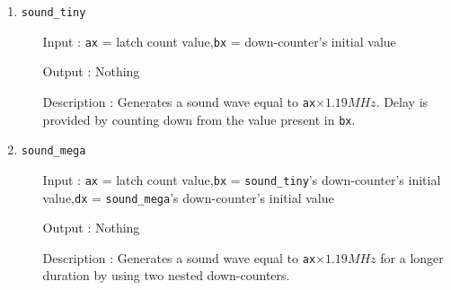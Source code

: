 \begin{enumerate}
  \item \texttt{sound\_tiny}
  		\begin{enumerate}[align=parleft, labelsep=2cm, leftmargin=1.06in]
  		  \item[Input]: \texttt{ax} = latch count value,\newline\texttt{bx} = down-counter's initial value
  		  \item[Output]: Nothing
  		  \item[Description]: Generates a sound wave equal to \texttt{ax}$\times 1.19 MHz$. Delay is provided by counting down from the value present in \texttt{bx}.
  		\end{enumerate}
  \item \texttt{sound\_mega}
  		\begin{enumerate}[align=parleft, labelsep=2cm, leftmargin=1.06in]
  		  \item[Input]: \texttt{ax} = latch count value,\newline\texttt{bx} = \texttt{sound\_tiny}'s down-counter's initial value,\newline\texttt{dx} = \texttt{sound\_mega}'s down-counter's initial value
  		  \item[Output]: Nothing
  		  \item[Description]: Generates a sound wave equal to \texttt{ax}$\times 1.19 MHz$ for a longer duration by using two nested down-counters.
  		\end{enumerate}
\end{enumerate}

